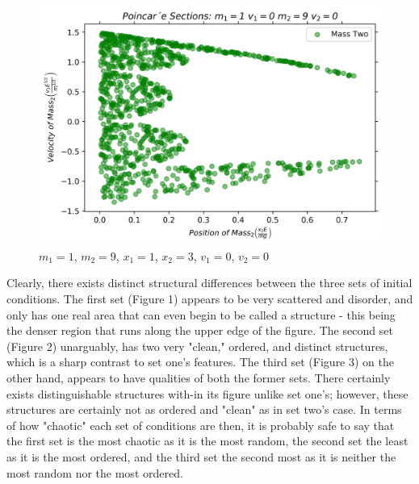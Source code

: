 \documentclass[twocolumn]{article}
\begin{document}
\begin{figure}[h]
\caption{$m_1=1$, $m_2=9$, $x_1=1$, $x_2=3$, $v_1=0$, $v_2=0$}
\centering
\includegraphics[scale=.45]{Section-IC3-Scatter}
\end{figure}
\hspace{-3.8mm}Clearly, there exists distinct structural differences between the three sets of initial conditions. The first set (Figure 1) appears to be very scattered and disorder, and only has one real area that can even begin to be called a structure - this being the denser region that runs along the upper edge of the figure. The second set (Figure 2) unarguably, has two very "clean," ordered, and distinct structures, which is a sharp contrast to set one's features. The third set (Figure 3) on the other hand, appears to have qualities of both the former sets. There certainly exists distinguishable structures with-in its figure unlike set one's; however, these structures are certainly not as ordered and "clean" as in set two's case. In terms of how "chaotic" each set of conditions are then, it is probably safe to say that the first set is the most chaotic as it is the most random, the second set the least as it is the most ordered, and the third set the second most as it is neither the most random nor the most ordered.
\end{document}
